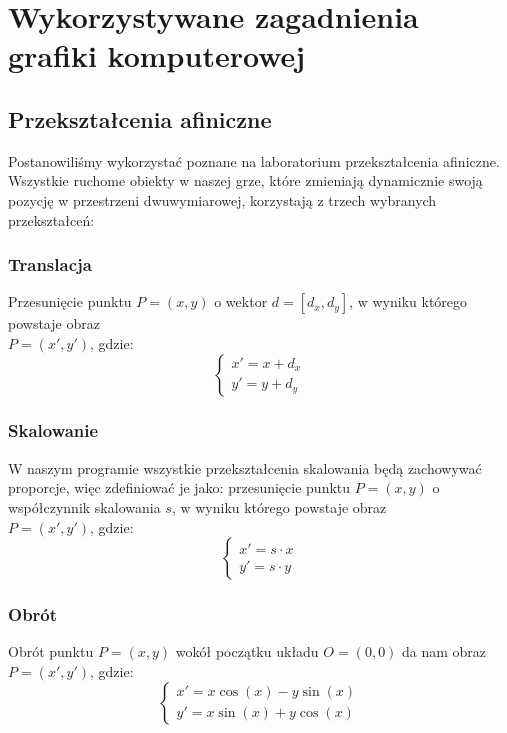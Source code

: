 \newpage
\section{Wykorzystywane zagadnienia grafiki komputerowej}
	\subsection{Przekształcenia afiniczne}
		\indent \indent Postanowiliśmy wykorzystać poznane na laboratorium przekształcenia afiniczne. Wszystkie ruchome obiekty w naszej grze, które zmieniają dynamicznie swoją pozycję w przestrzeni dwuwymiarowej, korzystają z trzech wybranych przekształceń:
		\subsubsection{Translacja}
			\indent \indent Przesunięcie punktu $ P=(x, y) $ o wektor $ d=[d_x, d_y] $, w wyniku którego powstaje obraz\\ $ P=(x', y') $, gdzie:
			$$
			\begin{cases}
			x'=x+d_x\\
			y'=y+d_y
			\end{cases}
			$$
		\subsubsection{Skalowanie}
			\indent \indent W naszym programie wszystkie przekształcenia skalowania będą zachowywać proporcje, więc zdefiniować je jako: przesunięcie punktu $ P=(x, y) $ o współczynnik skalowania $ s $, w wyniku którego powstaje obraz\\ $ P=(x', y') $, gdzie:
			$$
			\begin{cases}
			x'=s\cdot x\\
			y'=s\cdot y
			\end{cases}
			$$
		\subsubsection{Obrót}
			\indent \indent Obrót punktu $ P=(x, y) $ wokół początku układu $ O=(0, 0) $ da nam obraz $ P=(x', y') $, gdzie:
			$$
			\begin{cases}
			x'=x\cos(x)-y\sin(x)\\
			y'=x\sin(x)+y\cos(x)
			\end{cases}
			$$
